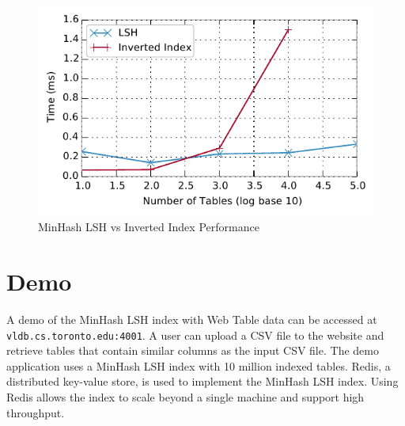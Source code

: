 \documentclass{sig-alternate}
\begin{document}
\begin{figure}[t]
\includegraphics[width=\columnwidth, natwidth=1, natheight=1]{lsh_time.pdf}
\caption{MinHash LSH vs Inverted Index Performance}
\label{fig:lsh_inverted}
\end{figure}


\section{Demo}
A demo of the MinHash LSH index with Web Table data can be accessed at
{\tt vldb.cs.toronto.edu:4001}.
A user can upload a CSV file to the website and retrieve tables that contain similar columns as the input CSV file.
The demo application uses a MinHash LSH index with
10 million indexed tables.
Redis, a distributed key-value store, is used to implement the MinHash LSH index.
Using Redis allows the index to scale beyond a single machine and support high
throughput.
\end{document}
